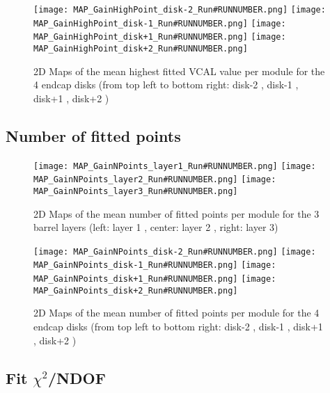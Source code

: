 \documentclass[a4paper,10pt]{article}
\begin{document}
\begin{figure}[htp]
 \centering
\subfigure
 {\texttt{[image: MAP\_GainHighPoint\_disk-2\_Run\#RUNNUMBER.png]}}
\subfigure
 {\texttt{[image: MAP\_GainHighPoint\_disk-1\_Run\#RUNNUMBER.png]}}
\subfigure
 {\texttt{[image: MAP\_GainHighPoint\_disk+1\_Run\#RUNNUMBER.png]}}
\subfigure
 {\texttt{[image: MAP\_GainHighPoint\_disk+2\_Run\#RUNNUMBER.png]}}
\caption{2D Maps of the mean highest fitted VCAL value per module for the 4 endcap disks (from top left to bottom right: disk-2 , disk-1 , disk+1 , disk+2 )}
\end{figure}


\pagebreak



\subsection{Number of fitted points}

\begin{figure}[htp]
 \centering
\subfigure
 {\texttt{[image: MAP\_GainNPoints\_layer1\_Run\#RUNNUMBER.png]}}
\subfigure
 {\texttt{[image: MAP\_GainNPoints\_layer2\_Run\#RUNNUMBER.png]}}
\subfigure
 {\texttt{[image: MAP\_GainNPoints\_layer3\_Run\#RUNNUMBER.png]}}
\caption{2D Maps of the mean number of fitted points per module for the 3 barrel layers (left: layer 1 , center: layer 2 , right: layer 3)}
\end{figure}

\begin{figure}[htp]
 \centering
\subfigure
 {\texttt{[image: MAP\_GainNPoints\_disk-2\_Run\#RUNNUMBER.png]}}
\subfigure
 {\texttt{[image: MAP\_GainNPoints\_disk-1\_Run\#RUNNUMBER.png]}}
\subfigure
 {\texttt{[image: MAP\_GainNPoints\_disk+1\_Run\#RUNNUMBER.png]}}
\subfigure
 {\texttt{[image: MAP\_GainNPoints\_disk+2\_Run\#RUNNUMBER.png]}}
\caption{2D Maps of the mean number of fitted points per module for the 4 endcap disks (from top left to bottom right: disk-2 , disk-1 , disk+1 , disk+2 )}
\end{figure}


\pagebreak





\subsection{Fit $\chi^2$/NDOF}
\end{document}
